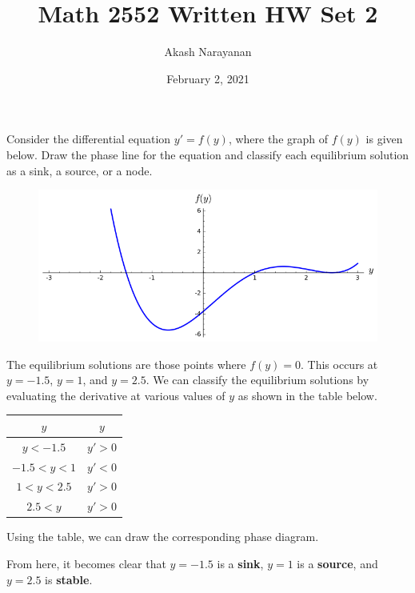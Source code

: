 \documentclass[11pt, titlepage]{article}
\title{Math 2552 Written HW Set 2}
\author{Akash Narayanan}
\date{February 2, 2021}
\begin{document}
  \maketitle

  \begin{problem}[Judson 1.3.21]
    Consider the differential equation \(y' = f(y)\), where the graph of \(f(y)\) is given below.
    Draw the phase line for the equation and classify each equilibrium solution as a sink, a source, or a node.
    \begin{figure}[h]
      \centering
      \includegraphics[scale=0.5]{media/Graph 1-3-21.png}
    \end{figure}
  \end{problem}

  \begin{solution}
    The equilibrium solutions are those points where \(f(y) = 0\).
    This occurs at \(y = -1.5\), \(y = 1\), and \(y = 2.5\).
    We can classify the equilibrium solutions by evaluating the derivative at various values of \(y\) as shown in the table below.
    \begin{center}
      \begin{tabular}{ |c|c| }
        \hline
        \(y\) & \(y\) \\
        \hline
        \(y < -1.5\) & \(y' > 0\) \\
        \hline
        \(-1.5 < y < 1\) & \(y' < 0\) \\
        \hline
        \(1 < y < 2.5\) & \(y' > 0\) \\
        \hline
        \(2.5 < y\) & \(y' > 0\) \\
        \hline
      \end{tabular}
    \end{center}
    Using the table, we can draw the corresponding phase diagram.

    \begin{figure}[h]
      \centering
    \end{figure}
    From here, it becomes clear that \(y = -1.5\) is a \textbf{sink}, \(y = 1\) is a \textbf{source}, and \(y = 2.5\) is \textbf{stable}.
  \end{solution}
\end{document}
